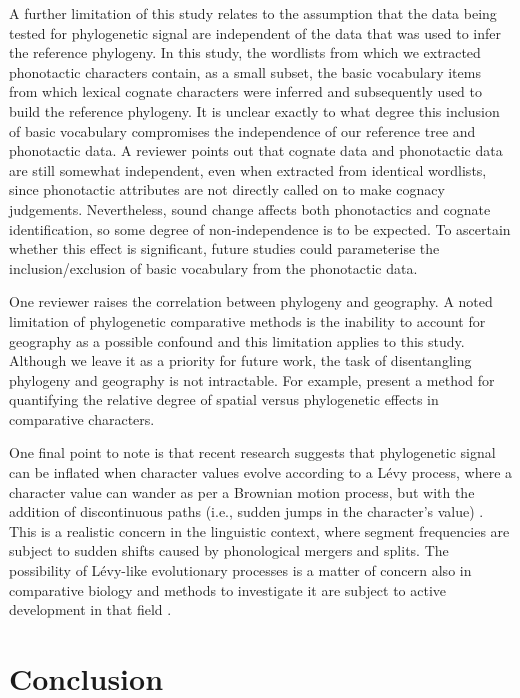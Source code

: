 A further limitation of this study relates to the assumption that the data being tested for phylogenetic signal are independent of the data that was used to infer the reference phylogeny. In this study, the wordlists from which we extracted phonotactic characters contain, as a small subset, the basic vocabulary items from which lexical cognate characters were inferred and subsequently used to build the reference phylogeny. It is unclear exactly to what degree this inclusion of basic vocabulary compromises the independence of our reference tree and phonotactic data. A reviewer points out that cognate data and phonotactic data are still somewhat independent, even when extracted from identical wordlists, since phonotactic attributes are not directly called on to make cognacy judgements. Nevertheless, sound change affects both phonotactics and cognate identification, so some degree of non-independence is to be expected. To ascertain whether this effect is significant, future studies could parameterise the inclusion/exclusion of basic vocabulary from the phonotactic data.

One reviewer raises the correlation between phylogeny and geography. A noted limitation of phylogenetic comparative methods is the inability to account for geography as a possible confound \autocite{sookias_deep_2018} and this limitation applies to this study. Although we leave it as a priority for future work, the task of disentangling phylogeny and geography is not intractable. For example, \textcite{freckleton_space_2009} present a method for quantifying the relative degree of spatial versus phylogenetic effects in comparative characters.

One final point to note is that recent research suggests that phylogenetic signal can be inflated when character values evolve according to a Lévy process, where a character value can wander as per a Brownian motion process, but with the addition of discontinuous paths (i.e., sudden jumps in the character's value) \autocite{uyeda_rethinking_2018}. This is a realistic concern in the linguistic context, where segment frequencies are subject to sudden shifts caused by phonological mergers and splits. The possibility of Lévy-like evolutionary processes is a matter of concern also in comparative biology and methods to investigate it are subject to active development in that field \autocite{uyeda_rethinking_2018}.

\hypertarget{phylo-sig-conclusion}{%
\section{Conclusion}\label{phylo-sig-conclusion}}

